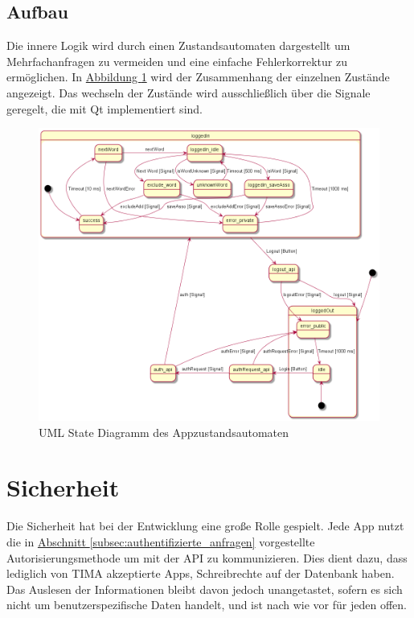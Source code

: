 \subsection{Aufbau}
Die innere Logik wird durch einen Zustandsautomaten dargestellt um
Mehrfachanfragen zu vermeiden und eine einfache Fehlerkorrektur zu ermöglichen.
In \hyperref[fig:uml_automata]{Abbildung \ref*{fig:uml_automata}} wird der Zusammenhang der einzelnen
Zustände angezeigt. Das wechseln der Zustände wird ausschließlich über die
Signale geregelt, die mit Qt implementiert sind.
\begin{figure}[!h]
	\centering
	\includegraphics[width=\textwidth]{../UML/app_automata.png}
	\caption{UML State Diagramm des Appzustandsautomaten}
	\label{fig:uml_automata}
\end{figure}

\section{Sicherheit}
Die Sicherheit hat bei der Entwicklung eine große Rolle gespielt. Jede App nutzt die in \hyperref[subsec:authentifizierte_anfragen]{Abschnitt \ref*{subsec:authentifizierte_anfragen}} vorgestellte Autorisierungsmethode um  mit der API zu kommunizieren.  Dies dient dazu, dass lediglich von TIMA
akzeptierte Apps, Schreibrechte auf der Datenbank haben. Das Auslesen
der Informationen bleibt davon jedoch unangetastet, sofern es sich nicht um benutzerspezifische Daten handelt, und ist nach wie vor für
jeden offen.
